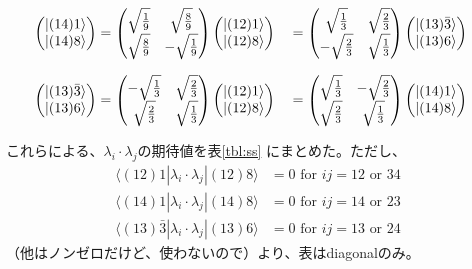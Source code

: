 \documentclass[a4j]{jarticle}
\def\bra{\langle}
\def\ket{\rangle}
\def\lamilamj{{\lambda_i\cdot\lambda_j}}
\begin{document}
\begin{align}
\begin{pmatrix}
|(14)1\ket
\\
|(14)8\ket
\end{pmatrix}
&=
\begin{pmatrix}
\sqrt{1\over 9}& \sqrt{8\over 9}
\\
\sqrt{8\over 9}&-\sqrt{1\over 9}
\end{pmatrix}
\begin{pmatrix}
|(12)1\ket
\\
|(12)8\ket
\end{pmatrix}
&&=
\begin{pmatrix}
\sqrt{1\over 3}& \sqrt{2\over 3}
\\
-\sqrt{2\over 3}& \sqrt{1\over 3}
\end{pmatrix}
\begin{pmatrix}
|(13)\bar3\ket
\\
|(13)6\ket
\end{pmatrix}
\end{align}

\begin{align}
\begin{pmatrix}
|(13)\bar3\ket
\\
|(13)6\ket
\end{pmatrix}
&=
\begin{pmatrix}
-\sqrt{1\over 3}& \sqrt{2\over 3}
\\
\sqrt{2\over 3}& \sqrt{1\over 3}
\end{pmatrix}
\begin{pmatrix}
|(12)1\ket
\\
|(12)8\ket
\end{pmatrix}
&&=
\begin{pmatrix}
\sqrt{1\over 3}&-\sqrt{2\over 3}
\\
\sqrt{2\over 3}& \sqrt{1\over 3}
\end{pmatrix}
\begin{pmatrix}
|(14)1\ket
\\
|(14)8\ket
\end{pmatrix}
\end{align}


これらによる、$\lamilamj$の期待値を表\ref{tbl:ss}
にまとめた。ただし、
\begin{align}
\bra (12)1|\lamilamj|(12)8\ket&=0 \text{\ \ for }ij=12\text{ or }34
\label{eq:off1}\\
\bra (14)1|\lamilamj|(14)8\ket&=0 \text{\ \ for }ij=14\text{ or }23
\label{eq:off2}\\
\bra (13)\bar3|\lamilamj|(13)6\ket&=0 \text{\ \ for }ij=13\text{ or }24
\label{eq:off3}
\end{align}
（他はノンゼロだけど、使わないので）より、表はdiagonalのみ。
\end{document}
